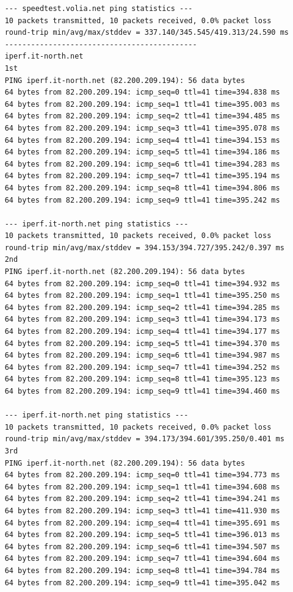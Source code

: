 \documentclass[paper=a4, fontsize=10pt]{scrartcl} %
\numberwithin{equation}{section} %
\numberwithin{figure}{section} %
\numberwithin{table}{section} %
\begin{document}
\begin{lstlisting}
    --- speedtest.volia.net ping statistics ---
    10 packets transmitted, 10 packets received, 0.0% packet loss
    round-trip min/avg/max/stddev = 337.140/345.545/419.313/24.590 ms
    --------------------------------------------
    iperf.it-north.net
    1st
    PING iperf.it-north.net (82.200.209.194): 56 data bytes
    64 bytes from 82.200.209.194: icmp_seq=0 ttl=41 time=394.838 ms
    64 bytes from 82.200.209.194: icmp_seq=1 ttl=41 time=395.003 ms
    64 bytes from 82.200.209.194: icmp_seq=2 ttl=41 time=394.485 ms
    64 bytes from 82.200.209.194: icmp_seq=3 ttl=41 time=395.078 ms
    64 bytes from 82.200.209.194: icmp_seq=4 ttl=41 time=394.153 ms
    64 bytes from 82.200.209.194: icmp_seq=5 ttl=41 time=394.186 ms
    64 bytes from 82.200.209.194: icmp_seq=6 ttl=41 time=394.283 ms
    64 bytes from 82.200.209.194: icmp_seq=7 ttl=41 time=395.194 ms
    64 bytes from 82.200.209.194: icmp_seq=8 ttl=41 time=394.806 ms
    64 bytes from 82.200.209.194: icmp_seq=9 ttl=41 time=395.242 ms
    
    --- iperf.it-north.net ping statistics ---
    10 packets transmitted, 10 packets received, 0.0% packet loss
    round-trip min/avg/max/stddev = 394.153/394.727/395.242/0.397 ms
    2nd
    PING iperf.it-north.net (82.200.209.194): 56 data bytes
    64 bytes from 82.200.209.194: icmp_seq=0 ttl=41 time=394.932 ms
    64 bytes from 82.200.209.194: icmp_seq=1 ttl=41 time=395.250 ms
    64 bytes from 82.200.209.194: icmp_seq=2 ttl=41 time=394.285 ms
    64 bytes from 82.200.209.194: icmp_seq=3 ttl=41 time=394.173 ms
    64 bytes from 82.200.209.194: icmp_seq=4 ttl=41 time=394.177 ms
    64 bytes from 82.200.209.194: icmp_seq=5 ttl=41 time=394.370 ms
    64 bytes from 82.200.209.194: icmp_seq=6 ttl=41 time=394.987 ms
    64 bytes from 82.200.209.194: icmp_seq=7 ttl=41 time=394.252 ms
    64 bytes from 82.200.209.194: icmp_seq=8 ttl=41 time=395.123 ms
    64 bytes from 82.200.209.194: icmp_seq=9 ttl=41 time=394.460 ms
    
    --- iperf.it-north.net ping statistics ---
    10 packets transmitted, 10 packets received, 0.0% packet loss
    round-trip min/avg/max/stddev = 394.173/394.601/395.250/0.401 ms
    3rd
    PING iperf.it-north.net (82.200.209.194): 56 data bytes
    64 bytes from 82.200.209.194: icmp_seq=0 ttl=41 time=394.773 ms
    64 bytes from 82.200.209.194: icmp_seq=1 ttl=41 time=394.608 ms
    64 bytes from 82.200.209.194: icmp_seq=2 ttl=41 time=394.241 ms
    64 bytes from 82.200.209.194: icmp_seq=3 ttl=41 time=411.930 ms
    64 bytes from 82.200.209.194: icmp_seq=4 ttl=41 time=395.691 ms
    64 bytes from 82.200.209.194: icmp_seq=5 ttl=41 time=396.013 ms
    64 bytes from 82.200.209.194: icmp_seq=6 ttl=41 time=394.507 ms
    64 bytes from 82.200.209.194: icmp_seq=7 ttl=41 time=394.604 ms
    64 bytes from 82.200.209.194: icmp_seq=8 ttl=41 time=394.784 ms
    64 bytes from 82.200.209.194: icmp_seq=9 ttl=41 time=395.042 ms
    

\end{lstlisting}
\end{document}
